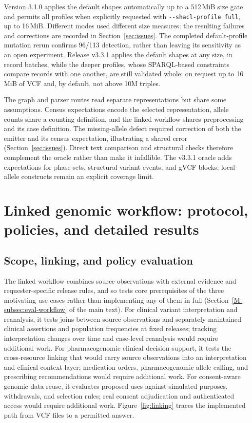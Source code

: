 \documentclass[11pt]{article}
\newcommand{\main}[1]{Section~\ref{M-#1} of the main text}
\begin{document}
Version 3.1.0 applies the default shapes automatically up to a 512\,MiB size gate and permits all profiles when explicitly requested with \texttt{-{}-shacl-profile full}, up to 16\,MiB.
Different modes used different size measures; the resulting failures and corrections are recorded in Section~\ref{sec:issues}.
The completed default-profile mutation rerun confirms 96/113 detection, rather than leaving its sensitivity as an open experiment.
Release v3.3.1 applies the default shapes at any size, in record batches, while the deeper profiles, whose SPARQL-based constraints compare records with one another, are still validated whole: on request up to 16\,MiB of VCF and, by default, not above 10M triples.

The graph and parser routes read separate representations but share some assumptions.
Census expectations encode the selected representation, allele counts share a counting definition, and the linked workflow shares preprocessing and its case definition.
The missing-allele defect required correction of both the emitter and its census expectation, illustrating a shared error (Section~\ref{sec:issues}).
Direct text comparison and structural checks therefore complement the oracle rather than make it infallible.
The v3.3.1 oracle adds expectations for phase sets, structural-variant events, and gVCF blocks; local-allele constructs remain an explicit coverage limit.

\section{Linked genomic workflow: protocol, policies, and detailed results}\label{sec:usecase}
\subsection{Scope, linking, and policy evaluation}\label{subsec:usecase-linksets}
The linked workflow combines source observations with external evidence and requester-specific release rules, and so tests core prerequisites of the three motivating use cases rather than implementing any of them in full (\main{subsec:eval-workflow}).
For clinical variant interpretation and reanalysis, it tests joins between source observations and separately maintained clinical assertions and population frequencies at fixed releases; tracking interpretation changes over time and case-level reanalysis would require additional work.
For pharmacogenomic clinical decision support, it tests the cross-resource linking that would carry source observations into an interpretation and clinical-context layer; medication orders, pharmacogenomic allele calling, and prescribing recommendations would require additional work.
For consent-aware genomic data reuse, it evaluates proposed uses against simulated purposes, withdrawals, and selection rules; real consent adjudication and authenticated access would require additional work.
Figure~\ref{fig:linking} traces the implemented path from VCF files to a permitted answer.
\end{document}
